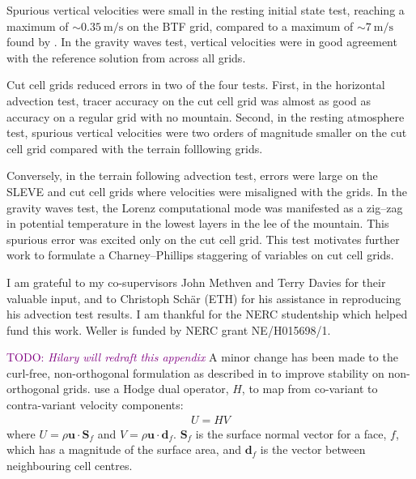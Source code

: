 \documentclass{ametsoc}
\newcommand{\TODO}[1]{\textcolor{purple}{TODO: \emph{#1}}}
\begin{document}
Spurious vertical velocities were small in the resting initial state test, reaching a maximum of $\sim \SI{0.35}{\meter\per\second}$ on the BTF grid, compared to a maximum of $\sim \SI{7}{\meter\per\second}$ found by \citet{klemp2011}.  In the gravity waves test, vertical velocities were in good agreement with the reference solution from \citet{melvin2010} across all grids.

Cut cell grids reduced errors in two of the four tests.  First, in the horizontal advection test, tracer accuracy on the cut cell grid was almost as good as accuracy on a regular grid with no mountain.  Second, in the resting atmosphere test, spurious vertical velocities were two orders of magnitude smaller on the cut cell grid compared with the terrain folllowing grids.

Conversely, in the terrain following advection test, errors were large on the SLEVE and cut cell grids where velocities were misaligned with the grids.  In the gravity waves test, the Lorenz computational mode was manifested as a zig--zag in potential temperature in the lowest layers in the lee of the mountain.  This spurious error was excited only on the cut cell grid.  This test motivates further work to formulate a Charney--Phillips staggering of variables on cut cell grids.

\acknowledgments
I am grateful to my co-supervisors John Methven and Terry Davies for their valuable input, and to Christoph Sch\"{a}r (ETH) for his assistance in reproducing his advection test results.  I am thankful for the NERC studentship which helped fund this work.  Weller is funded by NERC grant NE/H015698/1.

\appendix[A]

\TODO{Hilary will redraft this appendix}
A minor change has been made to the curl-free, non-orthogonal formulation as described in \citet{weller-shahrokhi2014} to improve stability on non-orthogonal grids.  \citet{weller-shahrokhi2014} use a Hodge dual operator, \(H\), to map from co-variant to contra-variant velocity components:
\begin{align}
	U = HV
\end{align}
where \(U = \rho\bm{u}\cdot\bm{S}_f\) and \(V=\rho\bm{u}\cdot\bm{d}_f\).  \(\bm{S}_f\) is the surface normal vector for a face, \(f\), which has a magnitude of the surface area, and \(\bm{d}_f\) is the vector between neighbouring cell centres.
\end{document}
